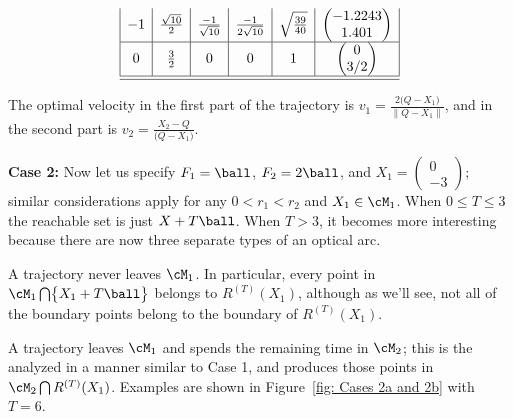 \documentclass[12pt]{article}
\begin{document}
\[\begin{array}{ll}
\begin{array}{|c|c|c|c|c|c|}
-1 &
\frac{\sqrt{10}}{2}& \frac{-1}{\sqrt{10}} & \frac{-1}{2\sqrt{10}}&
\sqrt{\frac{39}{40}} & \begin{pmatrix}  -1.2243 \\ 1.401 \end{pmatrix}
 \\\hline
0  & \frac{3}{2} & 0 & 0 & 1 & \begin{pmatrix} 0 \\ 3\slash 2\end{pmatrix} \\\hline\hline
\end{array}
\end{array}
\]

\noindent
The optimal velocity in the first part of the trajectory is
$v_1=\frac{2\bigl(Q-X_1\bigr)}{\|Q-X_1\|} $,
and in the second part is $v_2=\frac{X_2-Q}{\bigl(Q-X_1\bigr)}$.



\bigskip


\noindent
{\bf Case 2:}  Now let us specify $F_1=\ball$, $F_2=2\ball$, and $X_1=\begin{pmatrix}0 \\ -3\end{pmatrix}$; similar considerations apply for any $0<r_1<r_2$ and $X_1\in\cM_1$.  When $0\leq T\leq 3$ the reachable set is just $X+T\ball$.  When $T>3$, it becomes more interesting because there are now three separate types of an optical arc.  

  A trajectory never leaves $\cM_1$.  In particular, every point in $\cM_1\bigcap \bigl\{X_1+ T\ball\bigr\}$ belongs to $R^{(T)}(X_1)$, although as we'll see, not all of the boundary points belong to the boundary of $R^{(T)}(X_1)$.  

  A trajectory leaves $\cM_1$ and spends the remaining time in $\cM_2$; this is the analyzed in a manner similar to Case 1, and produces those points in $\cM_2\bigcap R^{(T)}(X_1)$.  Examples are shown in Figure~\ref{fig: Cases 2a and 2b} with $T=6$. 
\end{document}
